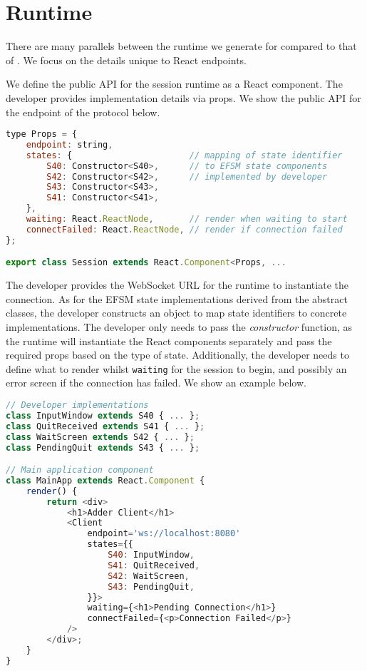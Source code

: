 \section{Runtime}
\label{section:reactruntime}

There are many parallels between the runtime we generate
for  compared to that of .
We focus on the details unique to React endpoints.

We define the public API for the session runtime
as a React component. The developer provides implementation details via
props.
We show the public API for the  endpoint
of the  protocol below.

\begin{lstlisting}[language=javascript]
type Props = {
	endpoint: string,
	states: {						// mapping of state identifier
		S40: Constructor<S40>,		// to EFSM state components
		S42: Constructor<S42>,		// implemented by developer
		S43: Constructor<S43>,
		S41: Constructor<S41>,
	},
	waiting: React.ReactNode,		// render when waiting to start
	connectFailed: React.ReactNode,	// render if connection failed
};

export class Session extends React.Component<Props, ...
\end{lstlisting}

The developer provides the WebSocket URL for the runtime
to instantiate the connection.
As for the EFSM state implementations derived from the abstract
classes, the developer constructs an object to map state identifiers
to concrete implementations. 
The developer only needs to pass the \textit{constructor} function,
as the runtime will instantiate the React components separately
and pass the required props based on the type of state.
Additionally, the developer needs to define what to render
whilst \texttt{waiting} for the session to begin, and possibly
an error screen if the connection has failed.
We show an example below.

\begin{lstlisting}[language=javascript,tabsize=2]
// Developer implementations
class InputWindow extends S40 { ... };
class QuitReceived extends S41 { ... };
class WaitScreen extends S42 { ... };
class PendingQuit extends S43 { ... };

// Main application component
class MainApp extends React.Component {
	render() {
		return <div>
			<h1>Adder Client</h1>
			<Client
				endpoint='ws://localhost:8080'
				states={{
					S40: InputWindow,
					S41: QuitReceived,
					S42: WaitScreen,
					S43: PendingQuit,		
				}}>
				waiting={<h1>Pending Connection</h1>}
				connectFailed={<p>Connection Failed</p>}
			/>
		</div>;
	}
}
\end{lstlisting}

